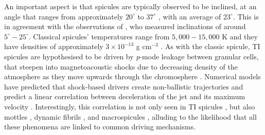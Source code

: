 %
An important aspect is that spicules are typically observed to be inclined, at an angle that ranges from approximately $20^{\circ}$ \citep{Beckers1968} to $37^{\circ}$ \citep{Trujillo2005ApJ619L191T}, with an average of $23^{\circ}$. This is in agreement with the observations of \cite{Pereira2012}, who measured inclinations of around $5^{\circ}-25^{\circ}$. Classical spicules' temperatures range from $5,000-15,000$ K and they have densities of approximately $3\times10^{-13}$ g cm$^{-3}$ \citep{Sterling_2000SoPh}. \np 
%
As with the classic spicule, TI spicules are hypothesised to be driven by \textit{p}-mode leakage between granular cells, that steepen into magnetoacoustic shocks due to decreasing density of the atmosphere as they move upwards through the chromosphere \citep{Pontieu2004Natur, Pontieu2007PASJ, Mart2009ApJ7011569M}. Numerical models have predicted that shock-based drivers create non-ballistic trajectories and predict a linear correlation between deceleration of the jet and its maximum velocity \citep{Heggland2007ApJ6661277H}. Interestingly, this correlation is not only seen in TI spicules \citep{Pereira2012}, but also mottles \citep{Rouppe2007ApJ660L169R}, dynamic fibrils \citep{De_Pontieu2007ApJ}, and macrospicules \citep{Loboda2019ApJ871230L}, alluding to the likelihood that all these phenomena are linked to common driving mechanisms.
